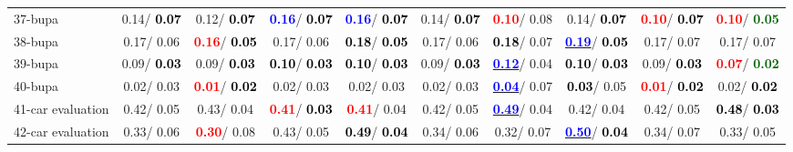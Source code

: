 \begin{table}[h]
\begin{center}
{\begin{tabular}{lc|c|c|c|c|c|c|c|c}
37-bupa &   0.14/\textcolor{black}{\textbf{  0.07}} &   0.12/\textcolor{black}{\textbf{  0.07}} & \textcolor{blue}{\textbf{  0.16}}/\textcolor{black}{\textbf{  0.07}} & \textcolor{blue}{\textbf{  0.16}}/\textcolor{black}{\textbf{  0.07}} &   0.14/\textcolor{black}{\textbf{  0.07}} & \textcolor{red}{\textbf{  0.10}}/  0.08 &   0.14/\textcolor{black}{\textbf{  0.07}} & \textcolor{red}{\textbf{  0.10}}/\textcolor{black}{\textbf{  0.07}} & \textcolor{red}{\textbf{  0.10}}/\textcolor{darkgreen}{\textbf{  0.05}} \\
38-bupa &   0.17/  0.06 & \textcolor{red}{\textbf{  0.16}}/\textcolor{black}{\textbf{  0.05}} &   0.17/  0.06 & \textcolor{black}{\textbf{  0.18}}/\textcolor{black}{\textbf{  0.05}} &   0.17/  0.06 & \textcolor{black}{\textbf{  0.18}}/  0.07 & \underline{\textcolor{blue}{\textbf{  0.19}}}/\textcolor{black}{\textbf{  0.05}} &   0.17/  0.07 &   0.17/  0.07 \\
39-bupa &   0.09/\textcolor{black}{\textbf{  0.03}} &   0.09/\textcolor{black}{\textbf{  0.03}} & \textcolor{black}{\textbf{  0.10}}/\textcolor{black}{\textbf{  0.03}} & \textcolor{black}{\textbf{  0.10}}/\textcolor{black}{\textbf{  0.03}} &   0.09/\textcolor{black}{\textbf{  0.03}} & \underline{\textcolor{blue}{\textbf{  0.12}}}/  0.04 & \textcolor{black}{\textbf{  0.10}}/\textcolor{black}{\textbf{  0.03}} &   0.09/\textcolor{black}{\textbf{  0.03}} & \textcolor{red}{\textbf{  0.07}}/\textcolor{darkgreen}{\textbf{  0.02}} \\ \hline
40-bupa &   0.02/  0.03 & \textcolor{red}{\textbf{  0.01}}/\textcolor{black}{\textbf{  0.02}} &   0.02/  0.03 &   0.02/  0.03 &   0.02/  0.03 & \underline{\textcolor{blue}{\textbf{  0.04}}}/  0.07 & \textcolor{black}{\textbf{  0.03}}/  0.05 & \textcolor{red}{\textbf{  0.01}}/\textcolor{black}{\textbf{  0.02}} &   0.02/\textcolor{black}{\textbf{  0.02}} \\
41-car evaluation &   0.42/  0.05 &   0.43/  0.04 & \textcolor{red}{\textbf{  0.41}}/\textcolor{black}{\textbf{  0.03}} & \textcolor{red}{\textbf{  0.41}}/  0.04 &   0.42/  0.05 & \underline{\textcolor{blue}{\textbf{  0.49}}}/  0.04 &   0.42/  0.04 &   0.42/  0.05 & \textcolor{black}{\textbf{  0.48}}/\textcolor{black}{\textbf{  0.03}} \\
42-car evaluation &   0.33/  0.06 & \textcolor{red}{\textbf{  0.30}}/  0.08 &   0.43/  0.05 & \textcolor{black}{\textbf{  0.49}}/\textcolor{black}{\textbf{  0.04}} &   0.34/  0.06 &   0.32/  0.07 & \underline{\textcolor{blue}{\textbf{  0.50}}}/\textcolor{black}{\textbf{  0.04}} &   0.34/  0.07 &   0.33/  0.05 \\

\end{tabular}}
\end{center}
\end{table}
